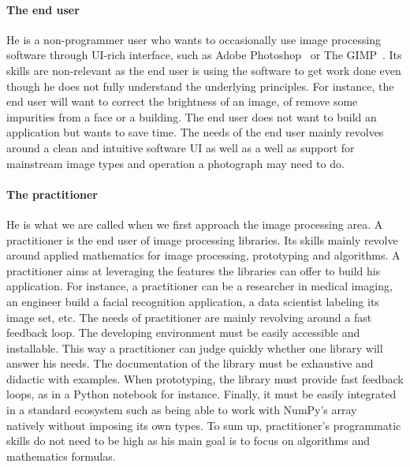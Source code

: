 \paragraph{The end user} He is a non-programmer user who wants to occasionally use image processing software through
UI-rich interface, such as Adobe Photoshop~\parencite{adobe.2019.photoshop} or The GIMP~\parencite{gimp.2019}. Its
skills are non-relevant as the end user is using the software to get work done even though he does not fully understand
the underlying principles. For instance, the end user will want to correct the brightness of an image, of remove some
impurities from a face or a building. The end user does not want to build an application but wants to save time. The
needs of the end user mainly revolves around a clean and intuitive software UI as well as a well as support for
mainstream image types and operation a photograph may need to do.

\paragraph{The practitioner} He is what we are called when we first approach the image processing area. A practitioner
is the end user of image processing libraries. Its skills mainly revolve around applied mathematics for image
processing, prototyping and algorithms. A practitioner aims at leveraging the features the libraries can offer to build
his application. For instance, a practitioner can be a researcher in medical imaging, an engineer build a facial
recognition application, a data scientist labeling its image set, etc. The needs of practitioner are mainly revolving
around a fast feedback loop. The developing environment must be easily accessible and installable. This way a
practitioner can judge quickly whether one library will answer his needs. The documentation of the library must be
exhaustive and didactic with examples. When prototyping, the library must provide fast feedback loops, as in a Python
notebook for instance. Finally, it must be easily integrated in a standard ecosystem such as being able to work with
NumPy's array~\parencite{oliphant.2006.numpy,harris.2020.numpy} natively without imposing its own types. To sum up,
practitioner's programmatic skills do not need to be high as his main goal is to focus on algorithms and mathematics
formulas.


